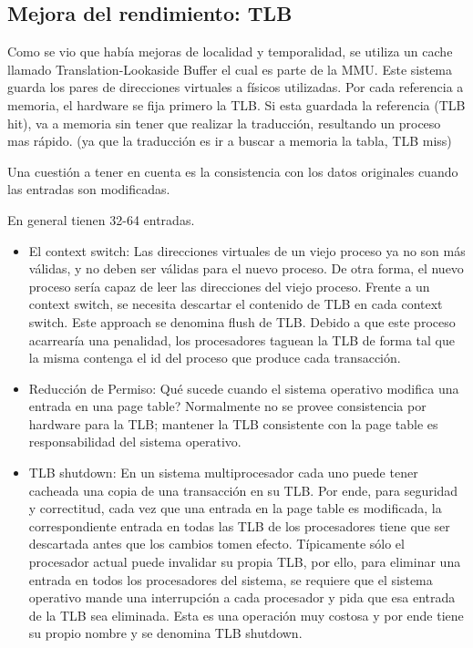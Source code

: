 \documentclass[titlepage,a4paper]{article}
\begin{document}
\newpage

\subsection*{Mejora del rendimiento: TLB}
Como se vio que había mejoras de localidad y temporalidad, se utiliza un cache llamado Translation-Lookaside Buffer el cual es parte de la MMU. Este sistema guarda los pares de direcciones virtuales a físicos utilizadas. Por cada referencia a memoria, el hardware se fija primero la TLB. Si esta guardada la referencia (TLB hit), va a memoria sin tener que realizar la traducción, resultando un proceso mas rápido. (ya que la traducción es ir a buscar a memoria la tabla, TLB miss)

Una cuestión a tener en cuenta es la consistencia con los datos originales cuando las entradas son modificadas.

En general tienen 32-64 entradas.

\begin{itemize}
\item El context switch: Las direcciones virtuales de un viejo proceso ya no son más válidas, y no deben ser válidas para el nuevo proceso. De otra forma, el nuevo proceso sería capaz de leer las direcciones del viejo proceso. Frente a un context switch, se necesita descartar el contenido de TLB en cada context switch. Este approach se denomina flush de TLB. Debido a que este proceso acarrearía una penalidad, los procesadores taguean la TLB de forma tal que la misma contenga el id del proceso que produce cada transacción.
\item Reducción de Permiso: Qué sucede cuando el sistema operativo modifica una entrada en una page table? Normalmente no se provee consistencia por hardware para la TLB; mantener la TLB consistente con la page table es responsabilidad del sistema operativo.
\item TLB shutdown: En un sistema multiprocesador cada uno puede tener cacheada una copia de una transacción en su TLB. Por ende, para seguridad y correctitud, cada vez que una entrada en la page table es modificada, la correspondiente entrada en todas las TLB de los procesadores tiene que ser descartada antes que los cambios tomen efecto. Típicamente sólo el procesador actual puede invalidar su propia TLB, por ello, para eliminar una entrada en todos los procesadores del sistema, se requiere que el sistema operativo mande una interrupción a cada procesador y pida que esa entrada de la TLB sea eliminada. Esta es una operación muy costosa y por ende tiene su propio nombre y se denomina TLB shutdown.
\end{itemize}
\end{document}

